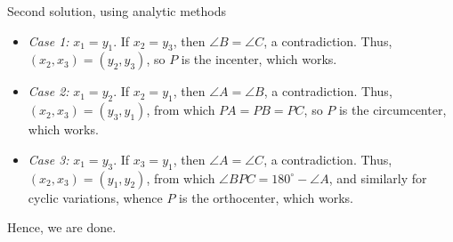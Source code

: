 \begin{customenv}{Second solution, using analytic methods}
\begin{itemize}
        \item \textit{Case 1:} $x_1=y_1$. If $x_2=y_3$, then $\angle B=\angle C$, a contradiction. Thus, $(x_2,x_3)=(y_2,y_3)$, so $P$ is the incenter, which works.
        \item \textit{Case 2:} $x_1=y_2$. If $x_2=y_1$, then $\angle A=\angle B$, a contradiction. Thus, $(x_2,x_3)=(y_3,y_1)$, from which $PA=PB=PC$, so $P$ is the circumcenter, which works.
        \item \textit{Case 3:} $x_1=y_3$. If $x_3=y_1$, then $\angle A=\angle C$, a contradiction. Thus, $(x_2,x_3)=(y_1,y_2)$, from which $\angle BPC=180^\circ-\angle A$, and similarly for cyclic variations, whence $P$ is the orthocenter, which works.
    \end{itemize}
    Hence, we are done. 
\end{customenv}
